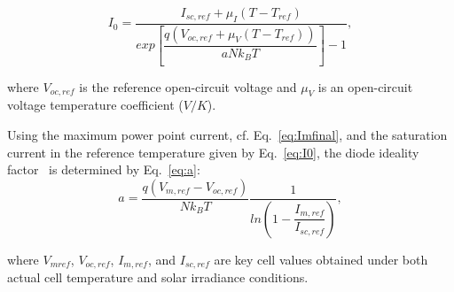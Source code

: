 \begin{equation}
\label{eq:I0}
I_{0} = \dfrac{I_{sc,ref} + \mu_{I}(T - T_{ref})}{exp \left[ \dfrac{q(V_{oc,ref} + \mu_{V} (T - T_{ref}))}{aNk_{B}T}    \right] -1},
\end{equation}

\noindent where $ V_{oc,ref} $ is the reference open-circuit voltage and $ \mu_{V} $ is an open-circuit voltage temperature coefficient ($ V/K $).

Using the maximum power point current, cf. Eq.~\eqref{eq:Imfinal}, and the saturation current in the reference temperature given by Eq.~\eqref{eq:I0}, the diode ideality factor~\cite{Saloux} is determined by Eq.~\eqref{eq:a}:
\begin{equation}
\label{eq:a}
a = \dfrac{q(V_{m,ref}-V_{oc,ref})}{Nk_{B}T} \dfrac{1}{ln \left( 1 - \dfrac{I_{m,ref}}{I_{sc,ref}}  \right) },
\end{equation}

\noindent where $V_{mref}$, $V_{oc,ref}$, $I_{m,ref}$, and $I_{sc,ref}$ are key cell values obtained under both actual cell temperature and solar irradiance conditions. %

%
%
%
%
%
%
  
